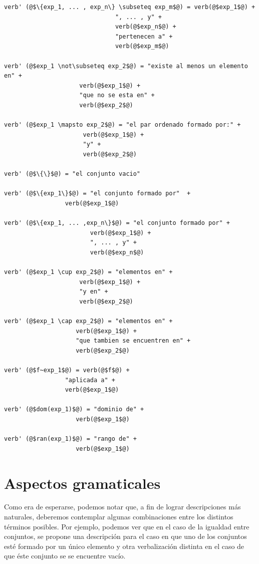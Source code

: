 \begin{mdframed}[style=codebox]
\begin{verbatim}
verb' (@$\{exp_1, ... , exp_n\} \subseteq exp_m$@) = verb(@$exp_1$@) +  
                               ", ... , y" +  
                               verb(@$exp_n$@) +  
                               "pertenecen a" +
                               verb(@$exp_m$@)

verb' (@$exp_1 \not\subseteq exp_2$@) = "existe al menos un elemento en" +  
                     verb(@$exp_1$@) +  
                     "que no se esta en" +  
                     verb(@$exp_2$@) 

verb' (@$exp_1 \mapsto exp_2$@) = "el par ordenado formado por:" +  
                      verb(@$exp_1$@) +  
                      "y" +  
                      verb(@$exp_2$@) 

verb' (@$\{\}$@) = "el conjunto vacio" 

verb' (@$\{exp_1\}$@) = "el conjunto formado por"  +  
                 verb(@$exp_1$@) 

verb' (@$\{exp_1, ... ,exp_n\}$@) = "el conjunto formado por" +  
                        verb(@$exp_1$@) +  
                        ", ... , y" +  
                        verb(@$exp_n$@) 

verb' (@$exp_1 \cup exp_2$@) = "elementos en" +  
                     verb(@$exp_1$@) +  
                     "y en" +  
                     verb(@$exp_2$@) 

verb' (@$exp_1 \cap exp_2$@) = "elementos en" +  
                    verb(@$exp_1$@) +  
                    "que tambien se encuentren en" +  
                    verb(@$exp_2$@) 

verb' (@$f~exp_1$@) = verb(@$f$@) +  
                 "aplicada a" +  
                 verb(@$exp_1$@) 

verb' (@$dom(exp_1)$@) = "dominio de" +  
                    verb(@$exp_1$@) 

verb' (@$ran(exp_1)$@) = "rango de" +  
                    verb(@$exp_1$@)  
\end{verbatim}
\end{mdframed}


\section{Aspectos gramaticales}
\label{sec:corpus_gramatica}

Como era de esperarse, podemos notar que, a fin de lograr descripciones más naturales, deberemos contemplar algunas combinaciones entre los distintos términos posibles. Por ejemplo, podemos ver que en el caso de la igualdad entre conjuntos, se propone una descripción para el caso en que uno de los conjuntos esté formado por un único elemento y otra verbalización distinta en el caso de que éste conjunto se se encuentre vacío.

